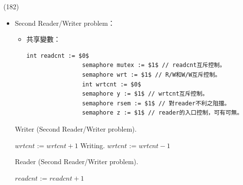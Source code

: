 \begin{theorem}{(182)}
\begin{itemize}
\begin{algorithm}[H]
        \end{algorithm}
        \item Second Reader/Writer problem：\begin{itemize}
            \item 共享變數：\begin{lstlisting}[caption={Shared variables of Second Reader/Writer problem.}, captionpos=b, mathescape=true]
                int readcnt := $0$
                semaphore mutex := $1$ // readcnt互斥控制。
                semaphore wrt := $1$ // R/W和W/W互斥控制。
                int wrtcnt := $0$
                semaphore y := $1$ // wrtcnt互斥控制。
                semaphore rsem := $1$ // 對reader不利之阻擋。
                semaphore z := $1$ // reader的入口控制，可有可無。
            \end{lstlisting}
        \end{itemize}
        \begin{algorithm}[H]
            \caption{Writer (Second Reader/Writer problem).}
            \begin{algorithmic}[1]
                    \Repeat
                        \State {} 
                        \State $wrtcnt$ := $wrtcnt + 1$
                         
                            \State {}
                        \EndIf
                        \State {}
                        \State {}
                        \State Writing.
                        \State {}
                        \State $wrtcnt$ := $wrtcnt - 1$
                            \State {} 
                        \EndIf
                        \State {}
                        \State {}
                \EndFunction
            \end{algorithmic}
        \end{algorithm}
        \begin{algorithm}[H]
            \caption{Reader (Second Reader/Writer problem).}
            \begin{algorithmic}[1]
                    \Repeat
                        \State {} 
                        \State {} 
                        \State {}
                        \State $readcnt$ := $readcnt + 1$

\end{algorithmic}
\end{algorithm}
\end{itemize}
\end{theorem}

